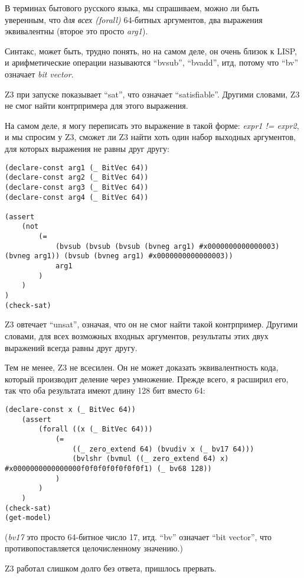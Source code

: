 В терминах бытового русского языка, мы спрашиваем, можно ли быть уверенным, что \textit{для всех (forall)}
64-битных аргументов, два выражения эквивалентны (второе это просто \textit{arg1}).

Синтакс, может быть, трудно понять, но на самом деле, он очень близок к LISP, и арифметические операции
называются ``bvsub'', ``bvadd'', итд, потому что ``bv'' означает \textit{bit vector}.

Z3 при запуске показывает ``sat'', что означает ``satisfiable''.
Другими словами, Z3 не смог найти контрпримера для этого выражения.

На самом деле, я могу переписать это выражение в такой форме: \textit{expr1 != expr2}, и мы спросим у Z3,
сможет ли Z3 найти хоть один набор выходных аргументов, для которых выражения не равны друг другу:

\begin{lstlisting}
(declare-const arg1 (_ BitVec 64))
(declare-const arg2 (_ BitVec 64))
(declare-const arg3 (_ BitVec 64))
(declare-const arg4 (_ BitVec 64))

(assert
    (not
        (=
            (bvsub (bvsub (bvsub (bvneg arg1) #x0000000000000003) (bvneg arg1)) (bvsub (bvneg arg1) #x0000000000000003))
            arg1
        )
    )
)
(check-sat)
\end{lstlisting}

Z3 овтечает ``unsat'', означая, что он не смог найти такой контрпример.
Другими словами, для всех возможных входных аргументов, результаты этих двух выражений всегда равны друг другу.

Тем не менее, Z3 не всесилен.
Он не может доказать эквивалентность кода, который производит деление через умножение.
Прежде всего, я расширил его, так что оба результата имеют длину 128 бит вместо 64:

\begin{lstlisting}
(declare-const x (_ BitVec 64))
    (assert
        (forall ((x (_ BitVec 64)))
            (=
                ((_ zero_extend 64) (bvudiv x (_ bv17 64)))
                (bvlshr (bvmul ((_ zero_extend 64) x) #x0000000000000000f0f0f0f0f0f0f0f1) (_ bv68 128))
            )
        )
    )
(check-sat)
(get-model)
\end{lstlisting}

(\textit{bv17} это просто 64-битное число 17, итд. ``bv'' означает ``bit vector'', что противопоставляется целочисленному
значению.)

Z3 работал слишком долго без ответа, пришлось прервать.

